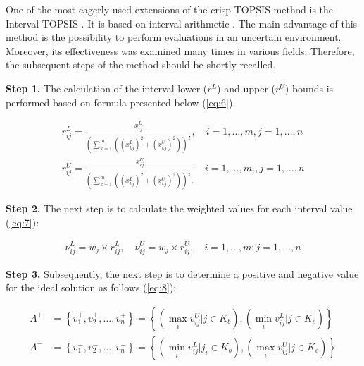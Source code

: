 One of the most eagerly used extensions of the crisp TOPSIS method is the Interval TOPSIS \cite{palczewski2019fuzzy}. It is based on interval arithmetic \cite{giove2002interval}. The main advantage of this method is the possibility to perform evaluations in an uncertain environment. Moreover, its effectiveness was examined many times in various fields. Therefore, the subsequent steps of the method should be shortly recalled.

\noindent \textbf{Step 1.} The calculation of the interval lower ($r^L$) and upper ($r^U$) bounds is performed based on formula presented below (\ref{eq:6}).

\begin{equation}
\begin{array}{lcl}
r_{i j}^{L}=\frac{x_{i j}^{L}}{\left(\sum_{k=1}^{m}\left(\left(x_{k j}^{L}\right)^{2}+\left(x_{k j}^{U}\right)^{2}\right)\right)^{\frac{1}{2}}}, \quad i=1, \ldots, m, j=1, \ldots, n \\
r_{i j}^{U}=\frac{x_{i j}^{U}}{\left(\sum_{k=1}^{m}\left(\left(x_{k j}^{L}\right)^{2}+\left(x_{k j}^{U}\right)^{2}\right)\right)^{\frac{1}{2}},} \quad i=1, \ldots, m_{i}, j=1, \ldots, n
\end{array}
\label{eq:6}
\end{equation}

\noindent \textbf{Step 2.}  The next step is to calculate the weighted values for each interval value (\ref{eq:7}):

\begin{equation}
\begin{array}{lcl}
\nu_{i j}^{L}=w_{j} \times r_{i j}^{L}, \quad \nu_{i j}^{U}=w_{j} \times r_{i j}^{U}, \quad i=1, \ldots, m ; j=1, \ldots, n
\end{array}
\label{eq:7}
\end{equation}

\noindent \textbf{Step 3.}  Subsequently, the next step is to determine a positive and negative value for the ideal solution as follows (\ref{eq:8}):

\begin{equation}
\begin{array}{lcl}
A^{+} &=\left\{v_{1}^{+}, v_{2}^{+}, \ldots, v_{n}^{+}\right\} =\left\{\left(\max _{i} v_{i j}^{U} | j \in K_{b}\right),\left(\min _{i} v_{i j}^{L} | j \in K_{c}\right)\right\} \\
A^{-} &=\left\{v_{1}^{-}, v_{2}^{-}, \ldots, v_{n}^{-}\right\} =\left\{\left(\min _{i} v_{i j}^{L} | j_{i} \in K_{b}\right),\left(\max _{i} v_{i j}^{U} | j \in K_{c}\right)\right\}
\end{array}
\label{eq:8}
\end{equation}

